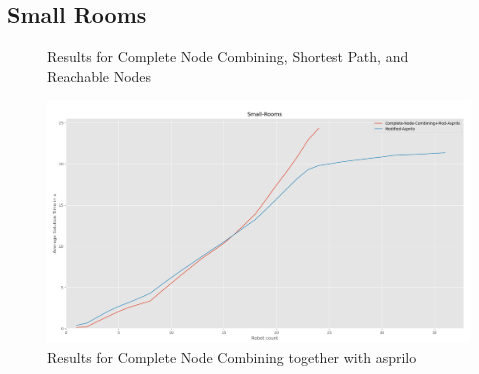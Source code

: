 \documentclass[runningheads]{llncs}
\begin{document}
\subsection{Small Rooms}
\begin{figure}[H]
\caption{Results for Complete Node Combining, Shortest Path, and Reachable Nodes}
\end{figure}
\begin{figure}[H]
\includegraphics[scale=0.35]{Images/Results-Small-Rooms-2}
\caption{Results for Complete Node Combining together with asprilo}
\end{figure}
\end{document}

